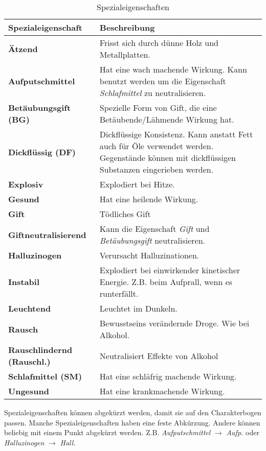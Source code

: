 \begin{table}[h]
\begin{center}
\begin{tabular}{|p{}|p{11cm}|}
\hline
\textbf{Spezialeigenschaft} & \textbf{Beschreibung} \\ \hline
\textbf{Ätzend} & Frisst sich durch dünne Holz und Metallplatten. \\ \hline
\textbf{Aufputschmittel} & Hat eine wach machende Wirkung. Kann benutzt werden um die Eigenschaft \textit{Schlafmittel} zu neutralisieren. \\ \hline
\textbf{Betäubungsgift (BG)} & Spezielle Form von Gift, die eine Betäubende/Lähmende Wirkung hat. \\ \hline
\textbf{Dickflüssig (DF)} & Dickflüssige Konsistenz. Kann anstatt Fett auch für Öle verwendet werden. Gegenstände können mit dickflüssigen Substanzen eingerieben werden. \\ \hline
\textbf{Explosiv} & Explodiert bei Hitze. \\ \hline
\textbf{Gesund} & Hat eine heilende Wirkung. \\ \hline
\textbf{Gift} & Tödliches Gift \\ \hline
\textbf{Giftneutralisierend} & Kann die Eigenschaft \textit{Gift} und \textit{Betäubungsgift} neutralisieren. \\ \hline
\textbf{Halluzinogen} & Verursacht Halluzinationen. \\ \hline
\textbf{Instabil} & Explodiert bei einwirkender kinetischer Energie. Z.B. beim Aufprall, wenn es runterfällt. \\ \hline
\textbf{Leuchtend} & Leuchtet im Dunkeln.  \\ \hline
\textbf{Rausch} & Bewusstseins verändernde Droge. Wie bei Alkohol. \\ \hline
\textbf{Rauschlindernd (Rauschl.)} & Neutralisiert Effekte von Alkohol \\ \hline
\textbf{Schlafmittel (SM)} & Hat eine schläfrig machende Wirkung. \\ \hline
\textbf{Ungesund} & Hat eine krankmachende Wirkung. \\ \hline

\end{tabular}
\end{center}
\caption{Spezialeigenschaften}
\label{tab:spezialeigenschaften}
\end{table}

Spezialeigenschaften können abgekürzt werden, damit sie auf den Charakterbogen passen. Manche Spezialeigenschaften haben eine feste Abkürzung. Andere können beliebig mit einem Punkt abgekürzt werden. Z.B. \textit{Aufputschmittel} $ \rightarrow $ \textit{Aufp.} oder \textit{Halluzinogen} $ \rightarrow $ \textit{Hall.}


